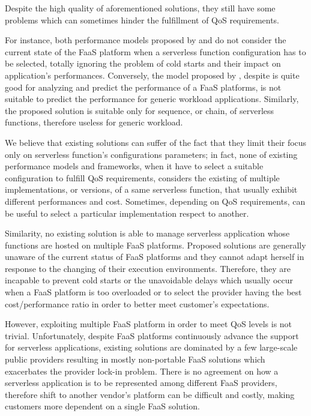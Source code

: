 \documentclass[12pt,a4paper]{report}
\begin{document}
Despite the high quality of aforementioned solutions, they still have some problems which can sometimes hinder the fulfillment of QoS requirements. 

For instance, both performance models proposed by \citet{COSE} and \citet{Modelling} do not consider the current state of the FaaS platform when a serverless function configuration has to be selected, totally ignoring the problem of cold starts and their impact on application's performances. Conversely, the model proposed by \citet{Modelling}, despite is quite good for analyzing and predict the performance of a FaaS platforms, is not suitable to predict the performance for generic workload applications. Similarly, the \citet{COSE} proposed solution is suitable only for sequence, or chain, of serverless functions, therefore useless for generic workload. 

We believe that existing solutions can suffer of the fact that they limit their focus only on serverless function's configurations parameters; in fact, none of existing performance models and frameworks, when it have to select a suitable configuration to fulfill QoS requirements, considers the existing of multiple implementations, or versions, of a same serverless function, that usually exhibit different performances and cost. Sometimes, depending on QoS requirements, can be useful to select a particular implementation respect to another. 

Similarity, no existing solution is able to manage serverless application whose functions are hosted on multiple FaaS platforms. Proposed solutions are generally unaware of the current status of FaaS platforms and they cannot adapt herself in response to the changing of their execution environments. Therefore, they are incapable to prevent cold starts or the unavoidable delays which usually occur when a FaaS platform is too overloaded or to select the provider having the best cost/performance ratio in order to better meet customer's expectations.

However, exploiting multiple FaaS platform in order to meet QoS levels is not trivial. Unfortunately, despite FaaS platforms continuously advance the support for serverless applications, existing solutions are dominated by a few large-scale public providers resulting in mostly non-portable FaaS solutions which exacerbates the provider lock-in problem. There is no agreement on how a serverless application is to be represented among different FaaS providers, therefore shift to another vendor's platform can be difficult and costly, making customers more dependent on a single FaaS solution.
\end{document}
